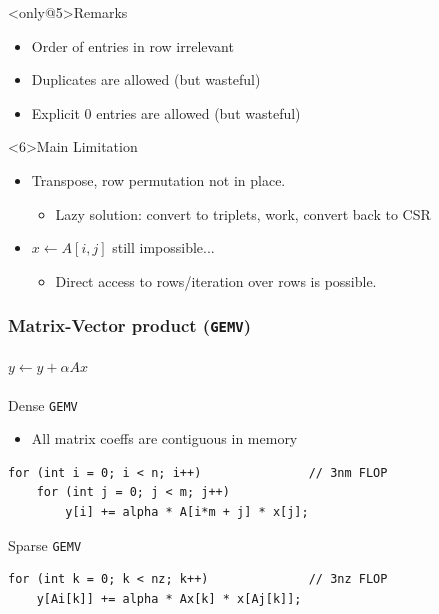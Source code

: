 \documentclass[xcolor={rgb,x11names,svgnames},rgb,x11names,svgnames]{beamer}
\begin{document}
\begin{frame}[fragile]
\begin{overlayarea}{\textwidth}{3cm}
\begin{block}<only@5>{Remarks}
  \begin{itemize}
  \item Order of entries in row irrelevant
  \item Duplicates are allowed (but wasteful)
  \item Explicit 0 entries are allowed (but wasteful)
  \end{itemize}
\end{block}


\begin{alertblock}<6>{Main Limitation}
  \begin{itemize}
  \item Transpose, row permutation not in place.
    \begin{itemize}      
    \item Lazy solution: convert to triplets, work, convert back to CSR
    \end{itemize}
  \item $x \gets A[i,j]$ still impossible... 
    \begin{itemize}      
    \item Direct access to rows/iteration over rows is possible.
    \end{itemize}

  \end{itemize}
\end{alertblock}
\end{overlayarea}
\end{frame}




\begin{frame}[fragile=singleslide]
  \frametitle{Matrix-Vector product (\texttt{GEMV})}
  \framesubtitle{$y \gets y + \alpha Ax$}
  \begin{alertblock}{Dense \texttt{GEMV}}
    \begin{itemize}
    \item All matrix coeffs are contiguous in memory
    \end{itemize}
    \vspace*{-2ex}
    \begin{verbatim}
for (int i = 0; i < n; i++)               // 3nm FLOP
    for (int j = 0; j < m; j++)
        y[i] += alpha * A[i*m + j] * x[j]; 
      \end{verbatim}
    \end{alertblock}
  
  \begin{exampleblock}{Sparse \texttt{GEMV}}
      \begin{verbatim}
for (int k = 0; k < nz; k++)              // 3nz FLOP
    y[Ai[k]] += alpha * Ax[k] * x[Aj[k]]; 
    \end{verbatim}
  \end{exampleblock}
\end{frame}
\end{document}

